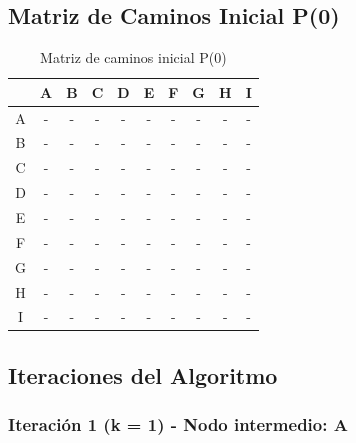 \documentclass[12pt]{article}
\begin{document}
\subsection{Matriz de Caminos Inicial P(0)}
\begin{table}[h!]
\centering
\begin{tabular}{|c|c|c|c|c|c|c|c|c|c|}
\hline
 & A & B & C & D & E & F & G & H & I \\\hline
A & - & - & - & - & - & - & - & - & - \\\hline
B & - & - & - & - & - & - & - & - & - \\\hline
C & - & - & - & - & - & - & - & - & - \\\hline
D & - & - & - & - & - & - & - & - & - \\\hline
E & - & - & - & - & - & - & - & - & - \\\hline
F & - & - & - & - & - & - & - & - & - \\\hline
G & - & - & - & - & - & - & - & - & - \\\hline
H & - & - & - & - & - & - & - & - & - \\\hline
I & - & - & - & - & - & - & - & - & - \\\hline
\end{tabular}
\caption{Matriz de caminos inicial P(0)}
\end{table}

\clearpage
\subsection{Iteraciones del Algoritmo}
\subsubsection{Iteración 1 (k = 1) - Nodo intermedio: A}
\end{document}
